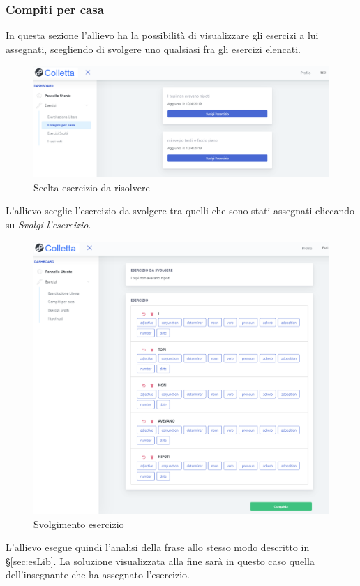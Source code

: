       
        \newpage
  		\subsubsection{Compiti per casa}
 		  In questa sezione l'allievo ha la possibilità di visualizzare gli esercizi a lui assegnati, scegliendo di svolgere uno qualsiasi fra gli esercizi elencati.
        	\begin{figure}[H]
            	\centering
            	\includegraphics[width=17cm]{sez/img/studente/compitopercasa.PNG} 
            	\caption{Scelta esercizio da risolvere}\label{fig:1}
        	\end{figure}

		  L'allievo sceglie l'esercizio da svolgere tra quelli che sono stati assegnati cliccando su \textit{Svolgi l'esercizio}.   
       
        	\begin{figure}[H]
            	\centering
            	\includegraphics[width=17cm]{sez/img/studente/svolgimentoesercizio.PNG} 
            	\caption{Svolgimento esercizio}\label{fig:1}
        	\end{figure}      
	L'allievo esegue quindi l'analisi della frase allo stesso modo descritto in \S\ref{sec:esLib}. La soluzione visualizzata alla fine sarà in questo caso quella dell'insegnante che ha assegnato l'esercizio.
        
